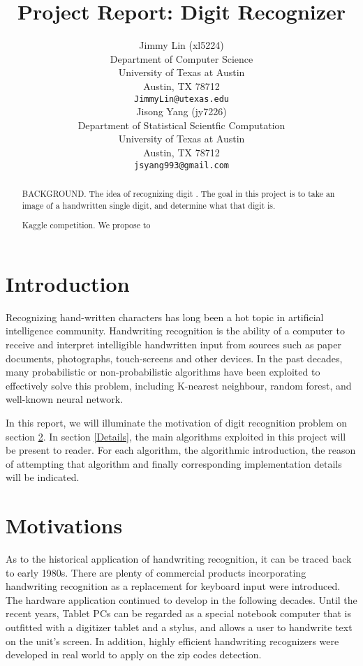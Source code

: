\documentclass{article} %
\title{Project Report: Digit Recognizer}
\author{
Jimmy Lin (xl5224) \\
Department of Computer Science\\
University of Texas at Austin\\
Austin, TX 78712 \\
\texttt{JimmyLin@utexas.edu} \\
\And
Jisong Yang (jy7226) \\
Department of Statistical Scientfic Computation\\
University of Texas at Austin\\
Austin, TX 78712 \\
\texttt{jsyang993@gmail.com} \\
}
\begin{document}
\maketitle

\begin{abstract}
    BACKGROUND. The idea of recognizing digit . 
    The goal in this project is to take an image of a handwritten single
    digit, and determine what that digit is.  
    
    Kaggle competition. 
    We propose to 

\end{abstract}

\section{Introduction}
Recognizing hand-written characters has long been a hot topic in artificial
intelligence community. 
Handwriting recognition is the ability of a computer to receive and
interpret intelligible handwritten input from sources such as paper documents,
photographs, touch-screens and other devices.
In the past decades, many probabilistic or non-probabilistic algorithms have
been exploited to effectively solve this problem, including K-nearest
neighbour, random forest, and well-known neural network. 

In this report, we will illuminate the motivation of digit recognition
problem on section \ref{Motivation}. In section \ref{Details}, the
 main algorithms exploited in this project will be present to reader. For each
 algorithm, the algorithmic introduction, the reason of attempting that
 algorithm and finally corresponding implementation details will be indicated. 

\section{Motivations} \label{Motivation}
As to the historical application of handwriting recognition, 
it can be traced back to early 1980s.  There are plenty of commercial products
incorporating handwriting recognition as a replacement for keyboard input were
introduced. The hardware application continued to develop
in the following decades.  Until the recent years, Tablet PCs can be regarded
as a special notebook computer that is outfitted with a digitizer tablet and a
stylus, and allows a user to handwrite text on the unit's screen. In addition,
highly efficient handwriting recognizers were developed in real world to apply
on the zip codes detection.
\end{document}
